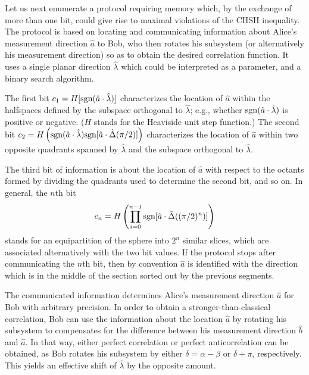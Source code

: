 \documentclass[prl,showpacs,showkeys,amsfonts,preprint]{revtex4}
\begin{document}

Let us next enumerate a protocol requiring memory which,
by the exchange of more than one bit,
could give rise to maximal violations \cite{svozil-krenn}
of the CHSH
inequality.
The protocol  is based on locating and communicating information about
Alice's measurement direction
${\hat a}$ to Bob, who then rotates his subsystem
(or alternatively his measurement direction)
so as to obtain the desired correlation function.
It uses a single planar direction $ {\hat \lambda }$ which could be interpreted as a
parameter, and a  binary search algorithm.

The first bit
$c_1= H [{\rm sgn}({\hat a} \cdot {\hat \lambda } )]$
characterizes the location of ${\hat a}$ within the halfspaces
defined by the subspace orthogonal to $ {\hat \lambda }$; e.g., whether
${\rm sgn}({\hat a} \cdot {\hat \lambda } )$ is positive or negative.
($H$ stands for the Heaviside unit step function.)
The second bit
$c_2= H \left({\rm sgn}({\hat a} \cdot {\hat \lambda } )
{\rm sgn}[{\hat a} \cdot {\hat \Delta} (\pi /2) ]\right)$
characterizes the location of ${\hat a}$
within two opposite
quadrants spanned by $ {\hat \lambda }$ and the subspace orthogonal to $ {\hat \lambda }$.

The third bit of information is about the location of ${\hat a}$ with respect to
the octants formed by dividing the quadrants used to determine the second bit,
and so on.
In general, the $n$th bit
\begin{equation}
c_n= H \left(
\prod_{i=0}^{n-1}{\rm sgn}[{\hat a} \cdot {\hat \Delta} ((\pi /2)^n) ]\right)
\end{equation}
stands for an equipartition of the sphere into
$2^n$ similar slices, which are associated alternatively with the two bit values.
If the protocol stops after communicating the $n$th bit,
then by convention ${\hat a}$ is identified with the direction which is in the middle
of the section sorted out by the previous segments.

The communicated information determines Alice's measurement direction ${\hat a}$ for Bob
with arbitrary precision.
In order to obtain a stronger-than-classical correlation,
Bob can use the information about the location ${\hat a}$ by rotating
his subsystem to compensates for the difference
between his measurement direction ${\hat b}$ and ${\hat a}$.
In that way, either perfect correlation or perfect anticorrelation
can be obtained, as Bob rotates his subsystem by either $\delta =\alpha -\beta$
or  $\delta + \pi $, respectively.
This yields an effective shift of ${\hat \lambda }$ by the opposite amount.
\end{document}
